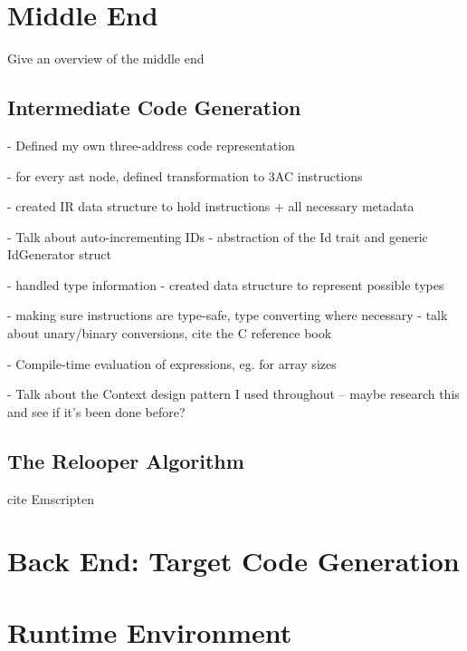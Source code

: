\documentclass[00-main.tex]{subfiles}
\begin{document}
\section{Middle End}

\begin{Comment}
Give an overview of the middle end
\end{Comment}

\subsection{Intermediate Code Generation}

\begin{Comment}
- Defined my own three-address code representation

- for every ast node, defined transformation to 3AC instructions

- created IR data structure to hold instructions + all necessary metadata

- Talk about auto-incrementing IDs - abstraction of the Id trait and generic IdGenerator struct

- handled type information - created data structure to represent possible types

- making sure instructions are type-safe, type converting where necessary - talk about unary/binary conversions, cite the C reference book

- Compile-time evaluation of expressions, eg. for array sizes

- Talk about the Context design pattern I used throughout -- maybe research this and see if it's been done before?
\end{Comment}

\subsection{The Relooper Algorithm}

\begin{Comment}
cite Emscripten \cite{emscripten}
\end{Comment}

\section{Back End: Target Code Generation}


\section{Runtime Environment}
\end{document}
